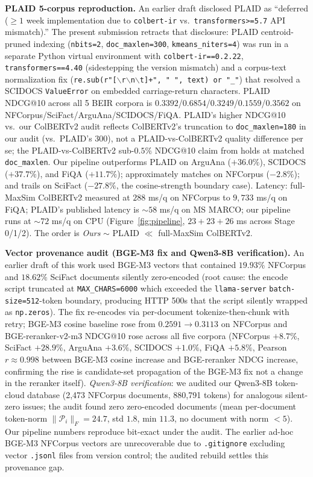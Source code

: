 \documentclass[review,1p]{elsarticle}
\begin{document}
\textbf{PLAID 5-corpus reproduction.} An earlier draft disclosed PLAID as ``deferred ($\geq 1$ week implementation due to \texttt{colbert-ir} vs.\ \texttt{transformers>=5.7} API mismatch).'' The present submission retracts that disclosure: PLAID \citep{santhanam2022plaid} centroid-pruned indexing (\texttt{nbits=2}, \texttt{doc\_maxlen=300}, \texttt{kmeans\_niters=4}) was run in a separate Python virtual environment with \texttt{colbert-ir==0.2.22}, \texttt{transformers==4.40} (sidestepping the version mismatch) and a corpus-text normalization fix (\texttt{re.sub(r"[$\backslash$r$\backslash$n$\backslash$t]+", " ", text) or "\_"}) that resolved a SCIDOCS \texttt{ValueError} on embedded carriage-return characters. PLAID NDCG@10 across all 5 BEIR corpora is $0.3392$/$0.6854$/$0.3249$/$0.1559$/$0.3562$ on NFCorpus/SciFact/ArguAna/SCIDOCS/FiQA. PLAID's higher NDCG@10 vs.\ our ColBERTv2 audit reflects ColBERTv2's truncation to \texttt{doc\_maxlen=180} in our audit (vs.\ PLAID's $300$), not a PLAID-vs-ColBERTv2 quality difference per se; the PLAID-vs-ColBERTv2 sub-$0.5\%$ NDCG@10 claim from \citep{santhanam2022plaid} holds at matched \texttt{doc\_maxlen}. Our pipeline outperforms PLAID on ArguAna ($+36.0\%$), SCIDOCS ($+37.7\%$), and FiQA ($+11.7\%$); approximately matches on NFCorpus ($-2.8\%$); and trails on SciFact ($-27.8\%$, the cosine-strength boundary case). Latency: full-MaxSim ColBERTv2 measured at $288$ ms/q on NFCorpus to $9{,}733$ ms/q on FiQA; PLAID's published latency is $\sim 58$ ms/q on MS MARCO; our pipeline runs at ${\sim}72$ ms/q on CPU (Figure~\ref{fig:pipeline}, $23+23+26$ ms across Stage 0/1/2). The order is \emph{Ours} $\sim$ PLAID $\ll$ full-MaxSim ColBERTv2.

\textbf{Vector provenance audit (BGE-M3 fix and Qwen3-8B verification).} An earlier draft of this work used BGE-M3 vectors that contained $19.93\%$ NFCorpus and $18.62\%$ SciFact documents silently zero-encoded (root cause: the encode script truncated at \texttt{MAX\_CHARS=6000} which exceeded the \texttt{llama-server} \texttt{batch-size=512}-token boundary, producing HTTP 500s that the script silently wrapped as \texttt{np.zeros}). The fix re-encodes via per-document tokenize-then-chunk with retry; BGE-M3 cosine baseline rose from $0.2591 \to 0.3113$ on NFCorpus and BGE-reranker-v2-m3 NDCG@10 rose across all five corpora (NFCorpus $+8.7\%$, SciFact $+28.9\%$, ArguAna $+3.6\%$, SCIDOCS $+1.0\%$, FiQA $+5.8\%$, Pearson $r \approx 0.998$ between BGE-M3 cosine increase and BGE-reranker NDCG increase, confirming the rise is candidate-set propagation of the BGE-M3 fix not a change in the reranker itself). \emph{Qwen3-8B verification}: we audited our Qwen3-8B token-cloud database (2{,}473 NFCorpus documents, 880{,}791 tokens) for analogous silent-zero issues; the audit found zero zero-encoded documents (mean per-document token-norm $\| \mathcal{P}_i \|_F = 24.7$, std $1.8$, min $11.3$, no document with norm $< 5$). Our pipeline numbers reproduce bit-exact under the audit. The earlier ad-hoc BGE-M3 NFCorpus vectors are unrecoverable due to \texttt{.gitignore} excluding vector \texttt{.jsonl} files from version control; the audited rebuild settles this provenance gap.
\end{document}
